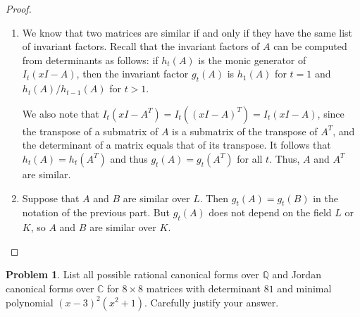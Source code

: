 \documentclass[11pt]{article}
\newcommand{\C}{\mathbb{C}}
\newcommand{\Q}{\mathbb{Q}}
\theoremstyle{definition}
\newtheorem{problem}{Problem}
\begin{document}
\begin{proof}
\begin{enumerate}
\item[(a)] We know that two matrices are similar if and  only if they have the same list of invariant factors. Recall that the invariant factors of $A$ can be computed from determinants as follows: if $h_t(A)$ is the monic generator of $I_t(xI-A)$, then the invariant factor $g_t(A)$ is $h_1(A)$ for $t=1$ and $h_t(A)/h_{t-1}(A)$ for $t>1$.

We also note that $I_t(xI-A^T) = I_t( (xI-A)^T ) = I_t(xI-A)$, since the transpose of a submatrix of $A$ is a submatrix of the transpose of $A^T$, and the determinant of a matrix equals that of its transpose. It follows that $h_t(A) = h_t(A^T)$ and thus $g_t(A)=g_t(A^T)$ for all $t$. Thus, $A$ and $A^T$ are similar.
\item[(b)] Suppose that $A$ and $B$ are similar over $L$. Then $g_t(A)=g_t(B)$ in the notation of the previous part. But $g_t(A)$ does not depend on the field $L$ or $K$, so $A$ and $B$ are similar over $K$.
\end{enumerate}

\end{proof}

\begin{problem} List all possible rational canonical forms over $\Q$ and Jordan canonical forms over $\C$
for $8 \times 8$ matrices with determinant $81$ and minimal polynomial $(x-3)^2(x^2 + 1)$. Carefully justify your answer.
\end{problem}
\end{document}
